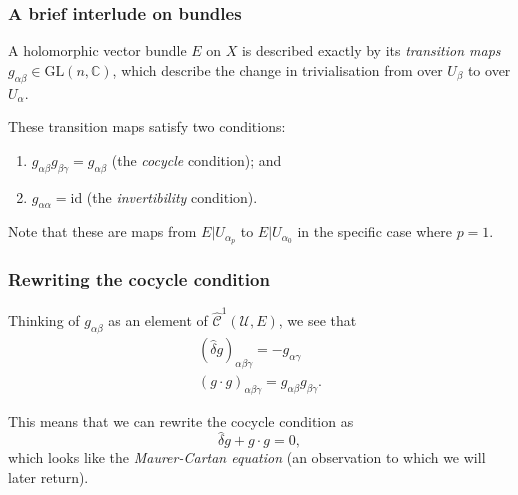 \documentclass{beamer}
\begin{document}
            \begin{frame}\frametitle{A brief interlude on bundles}
                A holomorphic vector bundle $E$ on $X$ is described exactly by its \emph{transition maps $g_{\alpha\beta}\in\mathrm{GL}(n,\mathbb{C})$}, which describe the change in trivialisation from over $U_\beta$ to over $U_\alpha$.

                \pause

                These transition maps satisfy two conditions:

                \pause
                
                \begin{enumerate}
                    \item $g_{\alpha\beta}g_{\beta\gamma}=g_{\alpha\beta}$ (the \emph{cocycle} condition); and
                    \pause
                    \item $g_{\alpha\alpha}=\mathrm{id}$ (the \emph{invertibility} condition).
                \end{enumerate}

                \pause

                Note that these are maps from $E|U_{\alpha_p}$ to $E|U_{\alpha_0}$ in the specific case where $p=1$.
            \end{frame}

            \begin{frame}\frametitle{Rewriting the cocycle condition}
                Thinking of $g_{\alpha\beta}$ as an element of $\hat{\mathscr{C}}^1(\mathcal{U},E)$, we see that
                \begin{gather*}
                    (\hat{\delta}g)_{\alpha\beta\gamma} = -g_{\alpha\gamma}\\
                    (g\cdot g)_{\alpha\beta\gamma} = g_{\alpha\beta}g_{\beta\gamma}.
                \end{gather*}

                \pause

                This means that we can rewrite the cocycle condition as
                \begin{equation*}
                    \hat{\delta}g + g\cdot g = 0,
                \end{equation*}
                which looks like the \emph{Maurer-Cartan equation} (an observation to which we will later return).
            \end{frame}
\end{document}

